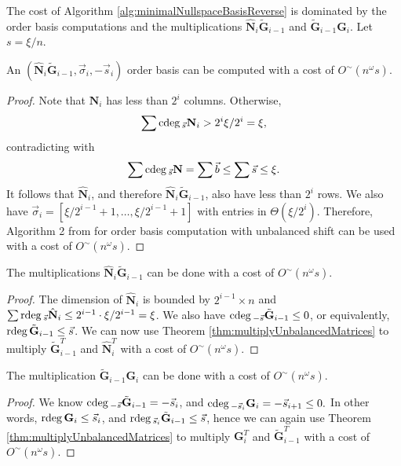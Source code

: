The cost of Algorithm \ref{alg:minimalNullspaceBasisReverse} is dominated
by the order basis computations and the multiplications $\hat{\mathbf{N}}_{i}\tilde{\mathbf{G}}_{i-1}$
and $\tilde{\mathbf{G}}_{i-1}\mathbf{G}_{i}$. Let $s=\xi/n$.
\begin{lem}
An $\left(\hat{\mathbf{N}}_{i}\tilde{\mathbf{G}}_{i-1},\vec{\sigma}_{i},-\vec{s}_{i}\right)$
order basis can be computed with a cost of $O^{\sim}\left(n^{\omega}s\right)$. \end{lem}
\begin{proof}
Note that $\mathbf{N}_{i}$ has less than $2^{i}$ columns. Otherwise,
\[
\sum{\rm cdeg}\,_{\vec{s}}\mathbf{N}_{i}>2^{i}\xi/2^{i}=\xi,
\]
contradicting with 
\[
\sum{\rm cdeg}\,_{\vec{s}}\mathbf{N}=\sum\vec{b}\le\sum\vec{s}\le\xi.
\]
It follows that $\hat{\mathbf{N}}_{i}$, and therefore $\hat{\mathbf{N}}_{i}\tilde{\mathbf{G}}_{i-1}$,
also have less than $2^{i}$ rows. We also have $\vec{\sigma}_{i}=\left[\xi/2^{i-1}+1,\dots,\xi/2^{i-1}+1\right]$
with entries in $\Theta\left(\xi/2^{i}\right)$. Therefore, Algorithm
2 from \cite{za2009} for order basis computation with unbalanced
shift can be used with a cost of $O^{\sim}\left(n^{\omega}s\right)$. \end{proof}
\begin{lem}
The multiplications $\hat{\mathbf{N}}_{i}\tilde{\mathbf{G}}_{i-1}$
can be done with a cost of $O^{\sim}\left(n^{\omega}s\right)$.\end{lem}
\begin{proof}
The dimension of $\hat{\mathbf{N}}_{i}$ is bounded by $2^{i-1}\times n$
and $\sum{\rm rdeg}\,_{\vec{s}}\hat{\mathbf{N}}_{i}\le2^{i-1}\cdot\xi/2^{i-1}=\xi$.
We also have ${\rm cdeg}\,_{-\vec{s}}\tilde{\mathbf{G}}_{i-1}\le0$, or equivalently,
${\rm rdeg}\,\tilde{\mathbf{G}}_{i-1}\le\vec{s}$. We can now use Theorem
\ref{thm:multiplyUnbalancedMatrices} to multiply $\tilde{\mathbf{G}}_{i-1}^{T}$
and $\hat{\mathbf{N}}_{i}^{T}$ with a cost of $O^{\sim}\left(n^{\omega}s\right)$.\end{proof}
\begin{lem}
The multiplication $\tilde{\mathbf{G}}_{i-1}\mathbf{G}_{i}$ can be
done with a cost of $O^{\sim}\left(n^{\omega}s\right)$. \end{lem}
\begin{proof}
We know ${\rm cdeg}\,_{-\vec{s}}\tilde{\mathbf{G}}_{i-1}=-\vec{s}_{i}$,
and ${\rm cdeg}\,_{-\vec{s}_{i}}\mathbf{G}_{i}=-\vec{s}_{i+1}\le0.$ In other
words, ${\rm rdeg}\,\mathbf{G}_{i}\le\vec{s}_{i}$, and ${\rm rdeg}\,_{\vec{s}_{i}}\tilde{\mathbf{G}}_{i-1}\le\vec{s}$,
hence we can again use Theorem \ref{thm:multiplyUnbalancedMatrices}
to multiply $\mathbf{G}_{i}^{T}$ and $\tilde{\mathbf{G}}_{i-1}^{T}$
with a cost of $O^{\sim}\left(n^{\omega}s\right)$. \end{proof}
